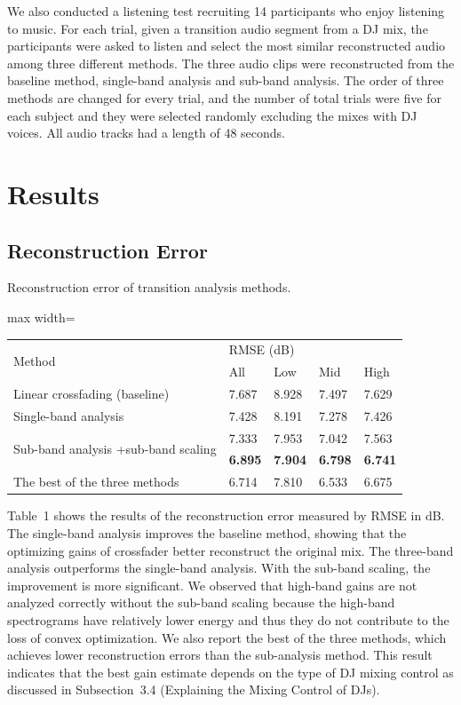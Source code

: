 \documentclass[sigconf]{nimeart}
\begin{document}
We also conducted a listening test recruiting 14 participants who enjoy listening to music. For each trial, given a transition audio segment from a DJ mix, the participants were asked to listen and select the most similar reconstructed audio among three different methods. The three audio clips were reconstructed from the baseline method, single-band analysis and sub-band analysis. The order of three methods are changed for every trial, and the number of total trials were five for each subject and they were selected randomly excluding the mixes with DJ voices. All audio tracks had a length of 48 seconds.

\section{Results}\label{results}

\subsection{Reconstruction Error}\label{reconstruction-error}

Reconstruction error of transition analysis methods.

\begin{table}[htbp]\centering\small
\begin{adjustbox}{max width=\textwidth}\begin{tabular}{lllll}
\toprule
\midrule
\multirow{2}{*}{Method} & \multicolumn{4}{l}{%
RMSE (dB)} \\
& All & Low & Mid & High \\
Linear crossfading (baseline) & 7.687 & 8.928 & 7.497 & 7.629 \\
Single-band analysis~\cite{c17} & 7.428 & 8.191 & 7.278 & 7.426 \\
\multirow{2}{*}{Sub-band analysis +sub-band scaling} & 7.333 & 7.953 & 7.042 & 7.563 \\
& \textbf{6.895} & \textbf{7.904} & \textbf{6.798} & \textbf{6.741} \\
The best of the three methods & 6.714 & 7.810 & 6.533 & 6.675 \\
\bottomrule
\end{tabular}\end{adjustbox}\end{table}

Table~1 shows the results of the reconstruction error measured by RMSE in dB. The single-band analysis improves the baseline method, showing that the optimizing gains of crossfader better reconstruct the original mix. The three-band analysis outperforms the single-band analysis. With the sub-band scaling, the improvement is more significant. We observed that high-band gains are not analyzed correctly without the sub-band scaling because the high-band spectrograms have relatively lower energy and thus they do not contribute to the loss of convex optimization. We also report the best of the three methods, which achieves lower reconstruction errors than the sub-analysis method. This result indicates that the best gain estimate depends on the type of DJ mixing control as discussed in Subsection~3.4 (Explaining the Mixing Control of DJs).
\end{document}
